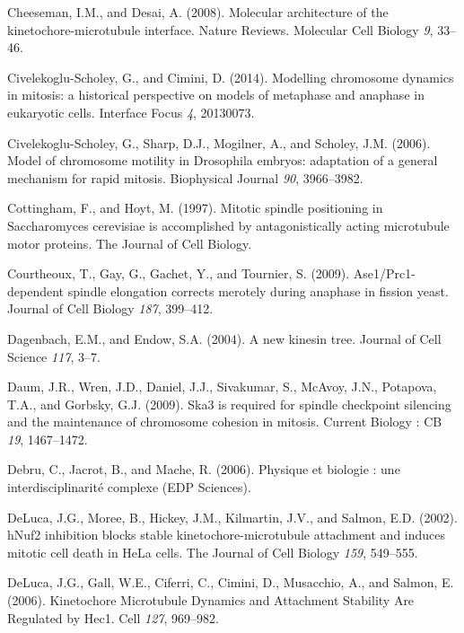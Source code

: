 \documentclass[12pt,a4paper,twoside,openright]{book}
\begin{document}
\hypertarget{ref-Cheeseman2008}{}
Cheeseman, I.M., and Desai, A. (2008). Molecular architecture of the
kinetochore-microtubule interface. Nature Reviews. Molecular Cell
Biology \emph{9}, 33--46.

\hypertarget{ref-Civelekoglu-Scholey2014}{}
Civelekoglu-Scholey, G., and Cimini, D. (2014). Modelling chromosome
dynamics in mitosis: a historical perspective on models of metaphase and
anaphase in eukaryotic cells. Interface Focus \emph{4}, 20130073.

\hypertarget{ref-Civelekoglu-Scholey2006}{}
Civelekoglu-Scholey, G., Sharp, D.J., Mogilner, A., and Scholey, J.M.
(2006). Model of chromosome motility in Drosophila embryos: adaptation
of a general mechanism for rapid mitosis. Biophysical Journal \emph{90},
3966--3982.

\hypertarget{ref-Cottingham1997}{}
Cottingham, F., and Hoyt, M. (1997). Mitotic spindle positioning in
Saccharomyces cerevisiae is accomplished by antagonistically acting
microtubule motor proteins. The Journal of Cell Biology.

\hypertarget{ref-Courtheoux2009}{}
Courtheoux, T., Gay, G., Gachet, Y., and Tournier, S. (2009).
Ase1/Prc1-dependent spindle elongation corrects merotely during anaphase
in fission yeast. Journal of Cell Biology \emph{187}, 399--412.

\hypertarget{ref-Dagenbach2004}{}
Dagenbach, E.M., and Endow, S.A. (2004). A new kinesin tree. Journal of
Cell Science \emph{117}, 3--7.

\hypertarget{ref-Daum2009}{}
Daum, J.R., Wren, J.D., Daniel, J.J., Sivakumar, S., McAvoy, J.N.,
Potapova, T.A., and Gorbsky, G.J. (2009). Ska3 is required for spindle
checkpoint silencing and the maintenance of chromosome cohesion in
mitosis. Current Biology : CB \emph{19}, 1467--1472.

\hypertarget{ref-Debru}{}
Debru, C., Jacrot, B., and Mache, R. (2006). Physique et biologie : une
interdisciplinarité complexe (EDP Sciences).

\hypertarget{ref-DeLuca2002}{}
DeLuca, J.G., Moree, B., Hickey, J.M., Kilmartin, J.V., and Salmon, E.D.
(2002). hNuf2 inhibition blocks stable kinetochore-microtubule
attachment and induces mitotic cell death in HeLa cells. The Journal of
Cell Biology \emph{159}, 549--555.

\hypertarget{ref-DeLuca2006}{}
DeLuca, J.G., Gall, W.E., Ciferri, C., Cimini, D., Musacchio, A., and
Salmon, E. (2006). Kinetochore Microtubule Dynamics and Attachment
Stability Are Regulated by Hec1. Cell \emph{127}, 969--982.
\end{document}
